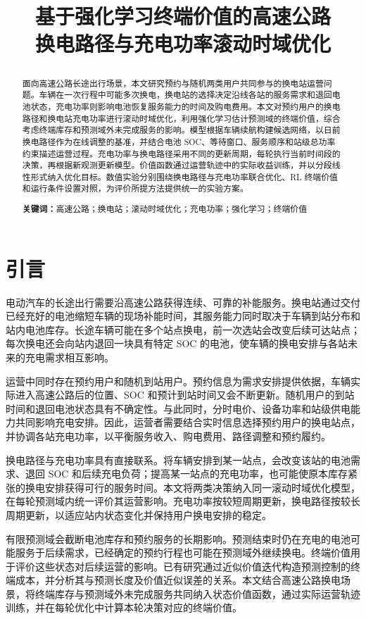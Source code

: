 \documentclass[12pt,a4paper,UTF8]{ctexart}
\title{\vspace{1.6cm}\heiti\LARGE 基于强化学习终端价值的高速公路\\[0.4em]换电路径与充电功率滚动时域优化\par\vspace{1.2cm}}
\author{\relax}
\date{}
\numberwithin{equation}{section}
\begin{document}
\cover
\thispagestyle{empty}
\clearpage
\begin{abstract}
面向高速公路长途出行场景，本文研究预约与随机两类用户共同参与的换电站运营问题。车辆在一次行程中可能多次换电，换电站的选择决定沿线各站的服务需求和退回电池状态，充电功率则影响电池恢复服务能力的时间及购电费用。本文对预约用户的换电路径和换电站充电功率进行滚动时域优化，利用强化学习估计预测域的终端价值，综合考虑终端库存和预测域外未完成服务的影响。模型根据车辆续航构建候选网络，以日前换电路径作为在线调整的基准，并结合电池 SOC、等待窗口、服务顺序和站级总功率约束描述运营过程。充电功率与换电路径采用不同的更新周期，每轮执行当前时间段的决策，再根据新观测更新模型。价值函数通过运营轨迹中的实际收益训练，并以分段线性形式纳入优化目标。数值实验分别围绕换电路径与充电功率联合优化、RL 终端价值和运行条件设置对照，为评价所提方法提供统一的实验方案。

\medskip
\noindent\textbf{关键词：}高速公路；换电站；滚动时域优化；充电功率；强化学习；终端价值
\end{abstract}
\clearpage
\tableofcontents
\clearpage

\section{引言}

电动汽车的长途出行需要沿高速公路获得连续、可靠的补能服务。换电站通过交付已经充好的电池缩短车辆的现场补能时间，其服务能力同时取决于车辆到站分布和站内电池库存。长途车辆可能在多个站点换电，前一次选站会改变后续可达站点；每次换电还会向站内退回一块具有特定 SOC 的电池，使车辆的换电安排与各站未来的充电需求相互影响。

运营中同时存在预约用户和随机到站用户。预约信息为需求安排提供依据，车辆实际进入高速公路后的位置、SOC 和预计到站时间又会不断更新。随机用户的到站时间和退回电池状态具有不确定性。与此同时，分时电价、设备功率和站级供电能力共同影响充电安排。因此，运营者需要结合实时信息选择预约用户的换电站点，并协调各站充电功率，以平衡服务收入、购电费用、路径调整和预约履约。

换电路径与充电功率具有直接联系。将车辆安排到某一站点，会改变该站的电池需求、退回 SOC 和后续充电负荷；提高某一站点的充电功率，也可能使原本库存紧张的换电安排获得可行的服务时间。本文将两类决策纳入同一滚动时域优化模型，在每轮预测域内统一评价其运营影响。充电功率按较短周期更新，换电路径按较长周期更新，以适应站内状态变化并保持用户换电安排的稳定。

有限预测域会截断电池库存和预约服务的长期影响。预测结束时仍在充电的电池可能服务于后续需求，已经确定的预约行程也可能在预测域外继续换电。终端价值用于评价这些状态对后续运营的影响。已有研究通过近似价值迭代构造预测控制的终端成本，并分析其与预测长度及价值近似误差的关系\cite{moreno2022terminal}。本文结合高速公路换电场景，将终端库存与预测域外未完成服务共同纳入状态价值函数，通过实际运营轨迹训练，并在每轮优化中计算本轮决策对应的终端价值。
\end{document}
